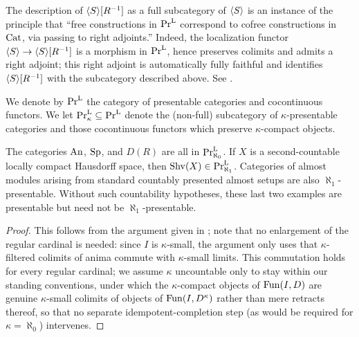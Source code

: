 \documentclass[11pt]{book}
\begin{document}
	\begin{remark}
		The description of $\langle S \rangle[R^{-1}]$ as a full subcategory of $\langle S \rangle$ is an instance of the principle that ``free constructions in $\textup{Pr}^{\textup{L}}$ correspond to cofree constructions in ${\textup{Cat}}$, via passing to right adjoints.'' Indeed, the localization functor $\langle S \rangle \to \langle S \rangle[R^{-1}]$ is a morphism in $\textup{Pr}^{\textup{L}}$, hence preserves colimits and admits a right adjoint; this right adjoint is automatically fully faithful and identifies $\langle S \rangle[R^{-1}]$ with the subcategory described above. See \cite[Proposition 5.5.4.20]{lurie2009HTT}.
	\end{remark}

	\begin{definition}
		We denote by $\textup{Pr}^{\textup{L}}$ the category of presentable categories and cocontinuous functors. We let $\textup{Pr}^{\textup{L}}_{\kappa} \subseteq \textup{Pr}^{\textup{L}}$ denote the (non-full) subcategory of $\kappa$-presentable categories and those cocontinuous functors which preserve $\kappa$-compact objects.
	\end{definition}

	\begin{example}
		The categories ${\textup{An}}$, ${\textup{Sp}}$, and $D(R)$ are all in $\textup{Pr}^{\textup{L}}_{\aleph_0}$. If $X$ is a second-countable locally compact Hausdorff space, then $\operatorname{Shv}(X) \in \textup{Pr}^{\textup{L}}_{\aleph_1}$. Categories of almost modules arising from standard countably presented almost setups are also $\aleph_1$-presentable. Without such countability hypotheses, these last two examples are presentable but need not be $\aleph_1$-presentable.
	\end{example}

	\begin{proof}
		This follows from the argument given in \cite[Proposition 5.4.4.3]{lurie2009HTT}; note that no
		enlargement of the regular cardinal is needed: since $I$ is
		$\kappa$-small, the argument only uses that $\kappa$-filtered colimits
		of anima commute with $\kappa$-small limits. This commutation holds for
		every regular cardinal; we assume $\kappa$ uncountable only to stay
		within our standing conventions, under which the $\kappa$-compact objects
		of $\operatorname{Fun}(I,D)$ are genuine $\kappa$-small colimits of objects of
		$\operatorname{Fun}(I,D^{\kappa})$ rather than mere retracts thereof, so that no
		separate idempotent-completion step (as would be required for
		$\kappa = \aleph_0$) intervenes.
	\end{proof}
\end{document}

